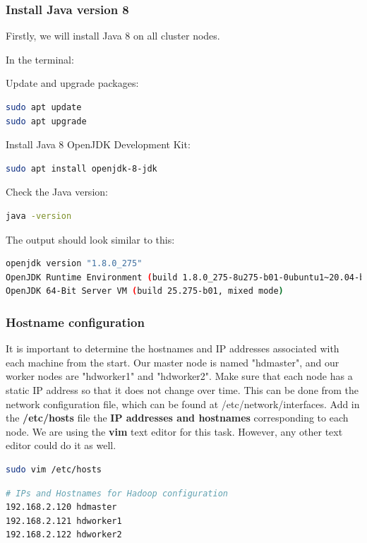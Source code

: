 \documentclass[12pt,english]{book}
\begin{document}
\subsubsection{Install Java version 8}

Firstly, we will install Java 8 on all cluster nodes.

In the terminal:

{\parindent 0pt Update and upgrade packages:}
\begin{lstlisting}[language=bash, frame=single, basicstyle=\footnotesize]
sudo apt update
sudo apt upgrade
\end{lstlisting}
Install Java 8 OpenJDK Development Kit:
\begin{lstlisting}[language=bash, frame=single, basicstyle=\footnotesize]
sudo apt install openjdk-8-jdk
\end{lstlisting}
Check the Java version:
\begin{lstlisting}[language=bash, frame=single, basicstyle=\footnotesize]
java -version
\end{lstlisting}
The output should look similar to this: 
\begin{lstlisting}[language=bash, frame=single, basicstyle=\footnotesize]
openjdk version "1.8.0_275"
OpenJDK Runtime Environment (build 1.8.0_275-8u275-b01-0ubuntu1~20.04-b01)
OpenJDK 64-Bit Server VM (build 25.275-b01, mixed mode)
\end{lstlisting}


\subsubsection{Hostname configuration}


It is important to determine the hostnames and IP addresses associated with each machine from the start.
Our master node is named "hdmaster", and our worker nodes are "hdworker1" and "hdworker2".
Make sure that each node has a static IP address so that it does not change over time.
This can be done from the network configuration file, which can be found at /etc/network/interfaces.
Add in the \textbf{/etc/hosts} file the \textbf{IP addresses and hostnames} corresponding to each node.
We are using the \textbf{vim} text editor for this task.
However, any other text editor could do it as well.
\begin{lstlisting}[language=bash, frame=single, basicstyle=\footnotesize]
sudo vim /etc/hosts
\end{lstlisting}
\begin{lstlisting}[language=bash, frame=single, basicstyle=\footnotesize]
# IPs and Hostnames for Hadoop configuration
192.168.2.120 hdmaster
192.168.2.121 hdworker1
192.168.2.122 hdworker2
\end{lstlisting}
\end{document}
